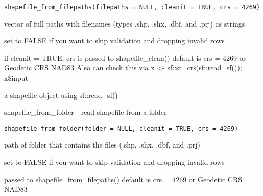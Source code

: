 \documentclass[a4paper]{book}
\begin{document}
%
\begin{Usage}
\begin{verbatim}
shapefile_from_filepaths(filepaths = NULL, cleanit = TRUE, crs = 4269)
\end{verbatim}
\end{Usage}
%
\begin{Arguments}
\begin{ldescription}
\item[\code{filepaths}] vector of full paths with filenames (types .shp, .shx, .dbf, and .prj) as strings

\item[\code{cleanit}] set to FALSE if you want to skip validation and dropping invalid rows

\item[\code{crs}] if cleanit = TRUE, crs is passed to shapefile\_clean()
default is crs = 4269 or Geodetic CRS NAD83
Also can check this via x <- sf::st\_crs(sf::read\_sf()); x\$input
\end{ldescription}
\end{Arguments}
%
\begin{Value}
a shapefile object using sf::read\_sf()
\end{Value}
%
\begin{SeeAlso}\relax
{}
\end{SeeAlso}
%
\begin{Description}\relax
shapefile\_from\_folder  -  read shapefile from a folder
\end{Description}
%
\begin{Usage}
\begin{verbatim}
shapefile_from_folder(folder = NULL, cleanit = TRUE, crs = 4269)
\end{verbatim}
\end{Usage}
%
\begin{Arguments}
\begin{ldescription}
\item[\code{folder}] path of folder that contains the files (.shp, .shx, .dbf, and .prj)

\item[\code{cleanit}] set to FALSE if you want to skip validation and dropping invalid rows

\item[\code{crs}] passed to shapefile\_from\_filepaths() default is crs = 4269 or Geodetic CRS NAD83
\end{ldescription}
\end{Arguments}
\end{document}
